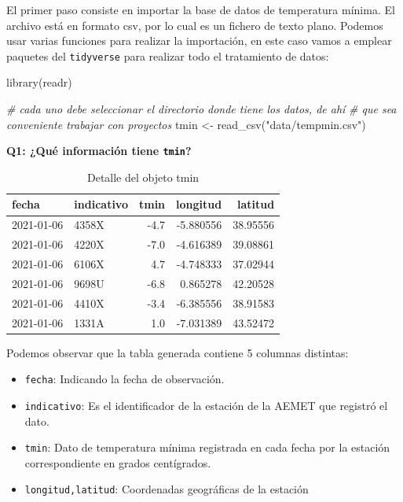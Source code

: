 \documentclass[
]{report}
\newenvironment{Shaded}{\begin{snugshade}}{\end{snugshade}}
\newcommand{\CommentTok}[1]{\textcolor[rgb]{0.56,0.35,0.01}{\textit{#1}}}
\newcommand{\FunctionTok}[1]{\textcolor[rgb]{0.00,0.00,0.00}{#1}}
\newcommand{\NormalTok}[1]{#1}
\newcommand{\OtherTok}[1]{\textcolor[rgb]{0.56,0.35,0.01}{#1}}
\newcommand{\StringTok}[1]{\textcolor[rgb]{0.31,0.60,0.02}{#1}}
\theoremstyle{definition}
\theoremstyle{definition}
\theoremstyle{definition}
\theoremstyle{definition}
\theoremstyle{remark}
\begin{document}
El primer paso consiste en importar la base de datos de temperatura mínima. El
archivo está en formato csv, por lo cual es un fichero de texto plano. Podemos
usar varias funciones para realizar la importación, en este caso vamos a emplear
paquetes del \texttt{tidyverse} para realizar todo el tratamiento de datos:

\begin{Shaded}
\begin{Highlighting}[]

\FunctionTok{library}\NormalTok{(readr)}

\CommentTok{\# cada uno debe seleccionar el directorio donde tiene los datos, de ahí}
\CommentTok{\# que sea conveniente trabajar con proyectos}
\NormalTok{tmin }\OtherTok{\textless{}{-}} \FunctionTok{read\_csv}\NormalTok{(}\StringTok{"data/tempmin.csv"}\NormalTok{)}
\end{Highlighting}
\end{Shaded}

\textbf{Q1: ¿Qué información tiene \texttt{tmin}?}

\begin{table}

\caption{\label{tab:tmin-head}Detalle del objeto tmin}
\centering
\begin{tabular}[t]{l|l|r|r|r}
\hline
fecha & indicativo & tmin & longitud & latitud\\
\hline
2021-01-06 & 4358X & -4.7 & -5.880556 & 38.95556\\
\hline
2021-01-06 & 4220X & -7.0 & -4.616389 & 39.08861\\
\hline
2021-01-06 & 6106X & 4.7 & -4.748333 & 37.02944\\
\hline
2021-01-06 & 9698U & -6.8 & 0.865278 & 42.20528\\
\hline
2021-01-06 & 4410X & -3.4 & -6.385556 & 38.91583\\
\hline
2021-01-06 & 1331A & 1.0 & -7.031389 & 43.52472\\
\hline
\end{tabular}
\end{table}

Podemos observar que la tabla generada contiene 5 columnas distintas:

\begin{itemize}
\item
  \texttt{fecha}: Indicando la fecha de observación.
\item
  \texttt{indicativo}: Es el identificador de la estación de la AEMET que registró el
  dato.
\item
  \texttt{tmin}: Dato de temperatura mínima registrada en cada fecha por la estación
  correspondiente en grados centígrados.
\item
  \texttt{longitud,latitud}: Coordenadas geográficas de la estación
\end{itemize}
\end{document}
